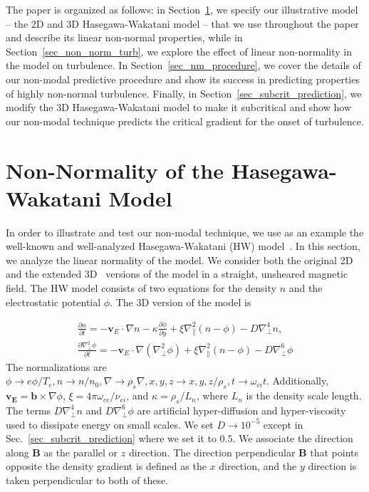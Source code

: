 \documentclass[twocolumn,showkeys,superscriptaddress]{revtex4}
\def\beqar{\begin{eqnarray}}
\def\eeqar{\end{eqnarray}}
\newcommand{\pdiff}[2]{\frac{\partial#1}{\partial#2}}
\def\grad{\nabla}
\newcommand{\gradpar}{\grad_\parallel}
\newcommand{\gradperp}{\grad_\perp}
\begin{document}
The paper is organized as follows: in Section~\ref{sec_hw_model}, we specify our illustrative model -- the 2D and 3D Hasegawa-Wakatani model -- 
that we use throughout the paper and describe its linear non-normal properties,  while in Section~\ref{sec_non_norm_turb}, we explore the effect of linear non-normality in the model on turbulence. 
In Section~\ref{sec_nm_procedure}, we cover the details of our non-modal predictive procedure and show its success in predicting properties of highly non-normal turbulence. 
Finally, in Section~\ref{sec_subcrit_prediction}, we modify the 3D Hasegawa-Wakatani model to make it subcritical and show how our non-modal technique predicts the critical gradient for the onset of turbulence.

\section{Non-Normality of the Hasegawa-Wakatani Model} 
\label{sec_hw_model}

In order to illustrate and test our non-modal technique, we use as an example the well-known and well-analyzed Hasegawa-Wakatani (HW) model~\cite{hasegawa1983}.
In this section, we analyze the linear normality of the model.
We consider both the original 2D and the extended 3D~\cite{biskamp1995} versions of the model in a straight, unsheared magnetic field. 
The HW model consists of two equations for the density $n$ and the electrostatic potential $\phi$. The 3D version of the model is

\beqar
\label{n_eq}
\pdiff{n}{t} = - {\mathbf v_E} \cdot \grad n - \kappa \pdiff{\phi}{y} + \xi \gradpar^2 (n - \phi) - D \gradperp^4 n, \\
\label{phi_eq}
\pdiff{\gradperp^2 \phi}{t} = - {\mathbf v_E} \cdot \grad (\gradperp^2 \phi) + \xi \gradpar^2 (n - \phi) - D \gradperp^6 \phi
\eeqar
The normalizations are $\phi \to e \phi/T_e, n \to n/n_0, \grad \to \rho_s \grad , x,y,z \to x,y,z/\rho_s, t \to \omega_{ci} t $. Additionally,
$\mathbf{v_E} = \mathbf{b} \times \grad \phi$, $\xi = 4 \pi \omega_{ce}/\nu_{ei}$, 
and $\kappa = \rho_s/L_n$, where $L_n$ is the density scale length. The terms $D \gradperp^4 n$ and $D \gradperp^6 \phi$ are artificial hyper-diffusion and hyper-viscosity used to dissipate
energy on small scales. We set $D \to 10^{-5}$ except in Sec.~\ref{sec_subcrit_prediction} where we set it to $0.5$.
We associate the direction along $\mathbf{B}$ as the parallel or $z$ direction. The direction perpendicular $\mathbf{B}$ that
points opposite the density gradient is defined as the $x$ direction, and the $y$ direction is taken perpendicular to both of these.
\end{document}
